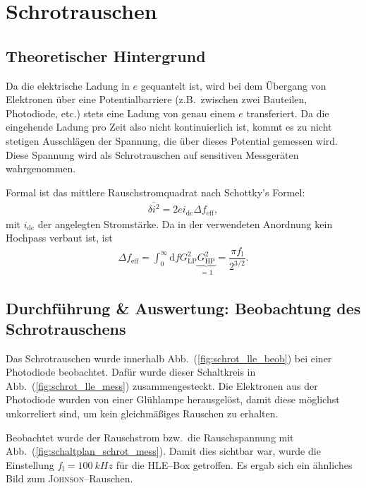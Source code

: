 \documentclass[sn-mathphys-num,iicol]{sn-jnl}
\theoremstyle{thmstyleone}
\theoremstyle{thmstyletwo}
\theoremstyle{thmstylethree}
\newcommand{\td}{\text{d}}
\begin{document}
\section{Schrotrauschen}
\subsection{Theoretischer Hintergrund}
Da die elektrische Ladung in $e$ gequantelt ist, wird bei dem Übergang von Elektronen über eine Potentialbarriere (z.B.\ zwischen zwei Bauteilen, Photodiode, etc.) stets eine Ladung von genau einem $e$ transferiert.
Da die eingehende Ladung pro Zeit also nicht kontinuierlich ist, kommt es zu nicht stetigen Ausschlägen der Spannung, die über dieses Potential gemessen wird.
Diese Spannung wird als Schrotrauschen auf sensitiven Messgeräten wahrgenommen.

Formal ist das mittlere Rauschstromquadrat nach Schottky's Formel:
\begin{align}
	\overline{\delta i^2}=2ei_\text{dc}\Delta f_\text{eff}
	,\end{align}
mit $i_\text{dc}$ der angelegten Stromstärke.
Da in der verwendeten Anordnung kein Hochpass verbaut ist, ist
\begin{align}
	\Delta f_\text{eff}=\int_{0}^{\infty}\td fG_\text{LP}^2\underbrace{G_\text{HP}^2}_{=1}=\dfrac{\pi f_\text{l}}{2^{3/2}}
	.\end{align}

\subsection{Durchführung \& Auswertung: Beobachtung des Schrotrauschens}
Das Schrotrauschen wurde innerhalb Abb.\ (\ref{fig:schrot_lle_beob}) bei einer Photodiode beobachtet.
Dafür wurde dieser Schaltkreis in Abb.\ (\ref{fig:schrot_lle_mess}) zusammengesteckt.
Die Elektronen aus der Photodiode wurden von einer Glühlampe herausgelöst, damit diese möglichst unkorreliert sind, um kein gleichmäßiges Rauschen zu erhalten.

Beobachtet wurde der Rauschstrom bzw.\ die Rauschspannung mit Abb.\ (\ref{fig:schaltplan_schrot_mess}).
Damit dies sichtbar war, wurde die Einstellung $f_\text{l}=\SI{100}{kHz}$ für die HLE--Box getroffen.
Es ergab sich ein ähnliches Bild zum \textsc{Johnson}--Rauschen. %
\end{document}
